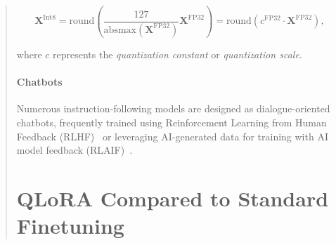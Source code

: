 \begin{quote}
{{\begin{equation}
    \mathbf{X}^{ \text{Int8}} = \text{round}\left( \frac{127}{{\text{absmax}}(\mathbf{X}^{{\text{FP32}}})}\mathbf{X}^{{\text{FP32}}} \right) = \text{round}(c^{\text{FP32}}\cdot \mathbf{X}^{{\text{FP32}}}),
\end{equation}

where $c$ represents the {\em quantization constant} or {\em quantization scale}. \paragraph{Chatbots} Numerous instruction-following models are designed as dialogue-oriented chatbots, frequently trained using Reinforcement Learning from Human Feedback (RLHF)~\citep{christiano2017deep} or leveraging AI-generated data for training with AI model feedback (RLAIF)~\citep{bai2022constitutional}. \section{QLoRA Compared to Standard Finetuning}
\label{sec:comp_to_std}

}}
\end{quote}
